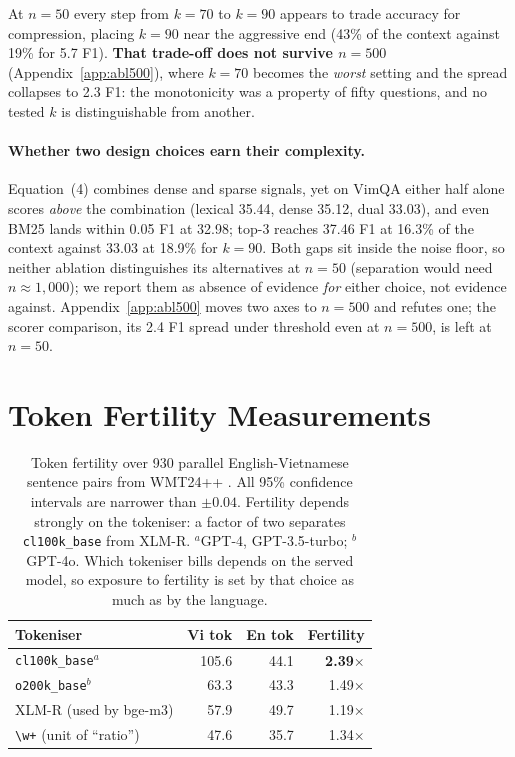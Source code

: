 \documentclass[11pt]{article}
\begin{document}
At $n=50$ every step from $k=70$ to $k=90$ appears to trade accuracy for
compression, placing $k=90$ near the aggressive end (43\% of the context against
19\% for 5.7 F1). \textbf{That trade-off does not survive $n=500$}
(Appendix~\ref{app:abl500}), where $k=70$ becomes the \emph{worst} setting and
the spread collapses to 2.3 F1: the monotonicity was a property of fifty
questions, and no tested $k$ is distinguishable from another.

\paragraph{Whether two design choices earn their complexity.} Equation~(4)
combines dense and sparse signals, yet on VimQA either half alone scores
\emph{above} the combination (lexical 35.44, dense 35.12, dual 33.03), and even
BM25 lands within 0.05 F1 at 32.98; top-3 reaches 37.46 F1 at 16.3\% of the
context against 33.03 at 18.9\% for $k=90$. Both gaps sit inside the noise floor,
so neither ablation distinguishes its alternatives at $n=50$ (separation would
need $n\approx1{,}000$); we report them as absence of evidence \emph{for} either
choice, not evidence against. Appendix~\ref{app:abl500} moves two axes to $n=500$
and refutes one; the scorer comparison, its 2.4 F1 spread under threshold even at
$n=500$, is left at $n=50$.

\section{Token Fertility Measurements}
\label{app:fert}

\begin{table}[htbp]
\centering
\small
\begin{tabular}{lrrr}
\toprule
Tokeniser & Vi tok & En tok & Fertility \\
\midrule
\texttt{cl100k\_base}$^a$ & 105.6 & 44.1 & \textbf{2.39}$\times$ \\
\texttt{o200k\_base}$^b$ & 63.3 & 43.3 & 1.49$\times$ \\
XLM-R (used by bge-m3) & 57.9 & 49.7 & 1.19$\times$ \\
\texttt{\textbackslash w+} (unit of ``ratio'') & 47.6 & 35.7 & 1.34$\times$ \\
\bottomrule
\end{tabular}
\caption{Token fertility over 930 parallel English-Vietnamese sentence pairs from
WMT24++ \citep{deutsch2025wmt24pp}. All 95\% confidence intervals are narrower
than $\pm0.04$. Fertility depends strongly on the tokeniser: a factor of two
separates \texttt{cl100k\_base} from XLM-R. $^a$GPT-4, GPT-3.5-turbo;
$^b$GPT-4o. Which tokeniser bills depends on the served model, so exposure to
fertility is set by that choice as much as by the language.}
\label{tab:fertility}
\end{table}
\end{document}
